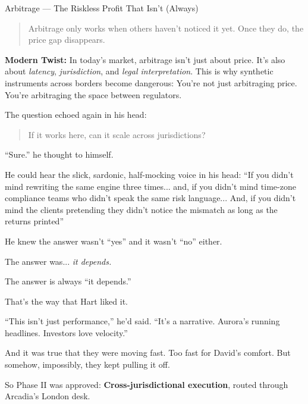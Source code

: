 \begin{TechnicalSidebar}{Arbitrage --- The Riskless Profit That Isn’t (Always)}
    \begin{quote}
      Arbitrage only works when others haven't noticed it yet. Once they do, the price gap disappears.
    \end{quote}
    
    \textbf{Modern Twist:}  
    In today’s market, arbitrage isn't just about price. It's also about \textit{latency}, 
    \textit{jurisdiction}, and \textit{legal interpretation}.  
    This is why synthetic instruments across borders become dangerous:  
    You're not just arbitraging price.  
    You're arbitraging the space between regulators.
    
\end{TechnicalSidebar}

\medskip

The question echoed again in his head:

\begin{quote}
    If it works here, can it scale across jurisdictions?
\end{quote}

``Sure.'' he thought to himself. 

He could hear the slick, sardonic, half-mocking voice in his head: ``If you didn’t mind rewriting 
the same engine three times... and,
if you didn’t mind time-zone compliance teams who didn’t speak the same risk language...
And, if you didn’t mind the clients pretending they didn’t notice the mismatch as long 
as the returns printed''

He knew the answer wasn’t ``yes'' and it wasn’t ``no'' either.

The answer was... 
\textit{it depends.}

The answer is always ``it depends.''

That's the way that Hart liked it.

``This isn’t just performance,'' he’d said. ``It’s a narrative. Aurora’s running headlines. Investors love 
velocity.''

And it was true that they were moving fast.
Too fast for David’s comfort.
But somehow, impossibly, they kept pulling it off.

So Phase II was approved:
\textbf{Cross-jurisdictional execution}, routed through Arcadia’s London desk.

\medskip

